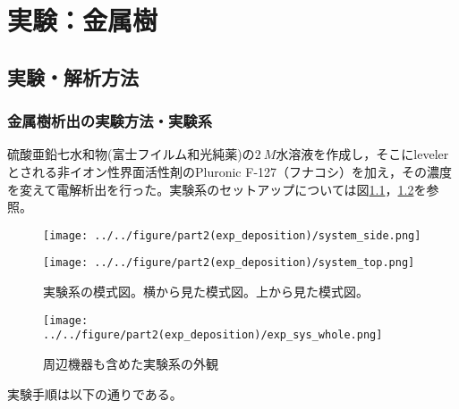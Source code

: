 \documentclass[autodetect-engine,dvi=dvipdfmx,a4paper,ja=standard,oneside,openany,11pt]{bxjsbook}
\begin{document}
\chapter{実験：金属樹}
\section{実験・解析方法}
\subsection{金属樹析出の実験方法・実験系}
硫酸亜鉛七水和物(富士フイルム和光純薬)の$\SI{2}{M}$水溶液を作成し，そこにlevelerとされる非イオン性界面活性剤のPluronic F-127（フナコシ）を加え，その濃度を変えて電解析出を行った。実験系のセットアップについては図\ref{fig:system_exp}，\ref{fig:system_exp_whole}を参照。

\begin{figure}[htbp]
  \begin{minipage}
    {0.55\textwidth}
    \subcaption{}
    \centering
    \texttt{[image: ../../figure/part2(exp\_deposition)/system\_side.png]}
    \label{fig:system_side}
  \end{minipage}
  \begin{minipage}
    {0.43\textwidth}
    \subcaption{}
    \centering
    \texttt{[image: ../../figure/part2(exp\_deposition)/system\_top.png]}
    \label{fig:system_top}
  \end{minipage}
  \caption{実験系の模式図。横から見た模式図。上から見た模式図。}
  \label{fig:system_exp}
\end{figure}

\begin{figure}[htbp]
  \centering
  \texttt{[image: ../../figure/part2(exp\_deposition)/exp\_sys\_whole.png]}
  \caption{周辺機器も含めた実験系の外観}
  \label{fig:system_exp_whole}
\end{figure}

実験手順は以下の通りである。
\end{document}
